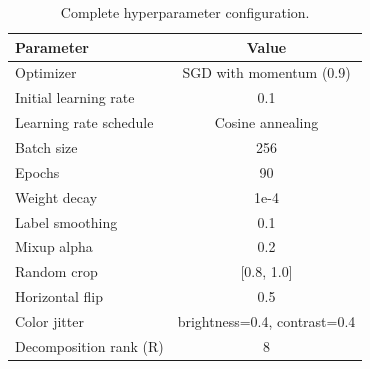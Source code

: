 \documentclass[10pt,twocolumn,letterpaper]{article}
\begin{document}
\begin{table}[h]
\centering
\caption{Complete hyperparameter configuration.}
\begin{tabular}{lc}
\toprule
\textbf{Parameter} & \textbf{Value} \\
\midrule
Optimizer & SGD with momentum (0.9) \\
Initial learning rate & 0.1 \\
Learning rate schedule & Cosine annealing \\
Batch size & 256 \\
Epochs & 90 \\
Weight decay & 1e-4 \\
Label smoothing & 0.1 \\
Mixup alpha & 0.2 \\
Random crop & [0.8, 1.0] \\
Horizontal flip & 0.5 \\
Color jitter & brightness=0.4, contrast=0.4 \\
Decomposition rank (R) & 8 \\
\bottomrule
\end{tabular}
\end{table}
\end{document}
